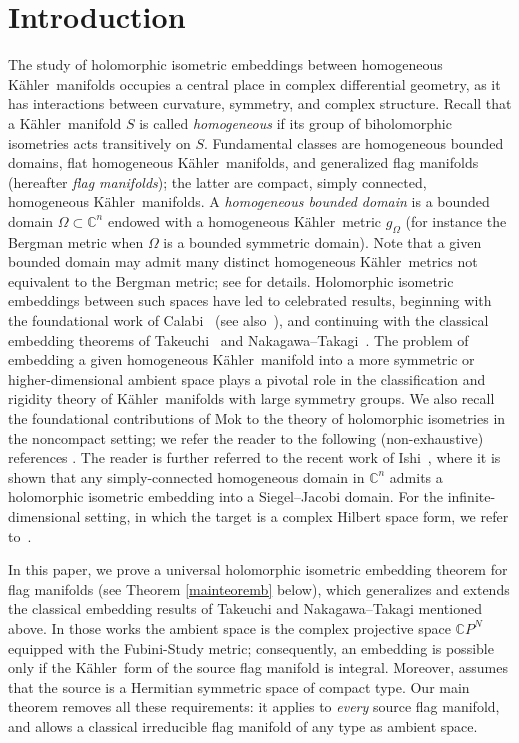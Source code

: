 \documentclass[reqno]{amsart}
\newcommand{\C}{\mathds{C}}
\newcommand{\K}{K\"{a}hler}
\begin{document}
\section{Introduction}\label{intro}
The study of holomorphic isometric embeddings between homogeneous \K\ manifolds occupies a central place in complex differential geometry, as it has interactions between curvature, symmetry, and complex structure. Recall that a \K\  manifold $S$ is called \emph{homogeneous} if its group of biholomorphic isometries acts transitively on $S$. Fundamental classes are homogeneous bounded domains, flat homogeneous \K\ manifolds, and generalized flag manifolds (hereafter \emph{flag manifolds}); the latter are compact, simply connected, homogeneous \K\ manifolds. A \emph{homogeneous bounded domain} is a bounded domain $\Omega\subset\C^n$ endowed with a homogeneous \K\ metric $g_\Omega$ (for instance the Bergman metric when $\Omega$ is a bounded symmetric domain). Note that a given bounded domain may admit many distinct homogeneous \K\  metrics not equivalent to the Bergman metric; see \cite{DISCALALOIISHI} for details. Holomorphic isometric embeddings between such spaces have led to celebrated results, beginning with the foundational work of Calabi~\cite{Cal} (see also~\cite{LoiZedda-book}), and continuing with the classical embedding theorems of Takeuchi~\cite{Take78} and Nakagawa--Takagi~\cite{NaTa76}. The problem of embedding a given homogeneous \K\ manifold into a more symmetric or higher-dimensional ambient space plays a pivotal role in the classification and rigidity theory of \K\ manifolds with large symmetry groups.
We also recall the  foundational contributions of Mok to the theory of holomorphic isometries in the noncompact setting;
we refer the reader to the following (non-exhaustive) references \cite{Mok1989, Mok2012, Mok2016}.
The reader is further referred to the recent work of Ishi~\cite{Ishi24}, where it is shown that any simply-connected homogeneous domain in $\C^n$ admits a holomorphic isometric embedding into a Siegel--Jacobi domain. For the infinite-dimensional setting, in which the target is a complex Hilbert space form, we refer to~\cite{DISCALALOIISHI}.


In this paper, we prove a universal holomorphic isometric embedding theorem for flag manifolds (see Theorem \ref{mainteoremb} below), which generalizes and extends the classical embedding results  of Takeuchi and Nakagawa--Takagi mentioned above.
In those works the ambient space is the complex projective space $\C P^N$
equipped with the Fubini-Study metric; consequently, an embedding is possible
only if the \K\ form of the source flag manifold is integral.
Moreover, \cite{NaTa76} assumes that the source is a
Hermitian symmetric space of compact type.
Our main theorem removes all these requirements: it applies to
\emph{every} source  flag manifold, and allows a
classical irreducible flag manifold of any type as  ambient space.
\end{document}
